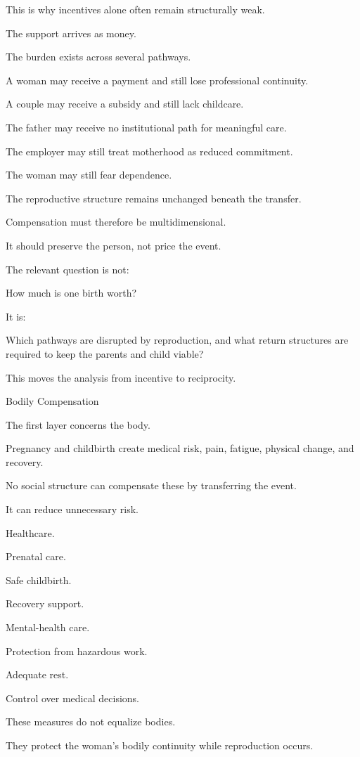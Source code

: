 This is why incentives alone often remain structurally weak.

The support arrives as money.

The burden exists across several pathways.

A woman may receive a payment and still lose professional continuity.

A couple may receive a subsidy and still lack childcare.

The father may receive no institutional path for meaningful care.

The employer may still treat motherhood as reduced commitment.

The woman may still fear dependence.

The reproductive structure remains unchanged beneath the transfer.

Compensation must therefore be multidimensional.

It should preserve the person, not price the event.

The relevant question is not:

How much is one birth worth?

It is:

Which pathways are disrupted by reproduction, and what return structures are required to keep the parents and child viable?

This moves the analysis from incentive to reciprocity.

Bodily Compensation

The first layer concerns the body.

Pregnancy and childbirth create medical risk, pain, fatigue, physical change, and recovery.

No social structure can compensate these by transferring the event.

It can reduce unnecessary risk.

Healthcare.

Prenatal care.

Safe childbirth.

Recovery support.

Mental-health care.

Protection from hazardous work.

Adequate rest.

Control over medical decisions.

These measures do not equalize bodies.

They protect the woman’s bodily continuity while reproduction occurs.


